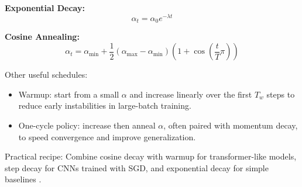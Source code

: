 \textbf{Exponential Decay:}
\begin{equation}
\alpha_t = \alpha_0 e^{-\lambda t}
\end{equation}

\textbf{Cosine Annealing:}
\begin{equation}
\alpha_t = \alpha_{\min} + \frac{1}{2}(\alpha_{\max} - \alpha_{\min})\left(1 + \cos\left(\frac{t}{T}\pi\right)\right)
\end{equation}

Other useful schedules:
\begin{itemize}
    \item Warmup: start from a small \(\alpha\) and increase linearly over the first \(T_w\) steps to reduce early instabilities in large-batch training.
    \item One-cycle policy: increase then anneal \(\alpha\), often paired with momentum decay, to speed convergence and improve generalization.
\end{itemize}

Practical recipe: Combine cosine decay with warmup for transformer-like models, step decay for CNNs trained with SGD, and exponential decay for simple baselines \cite{WebOptimizationDLBook,D2LChapterOptimization}.


